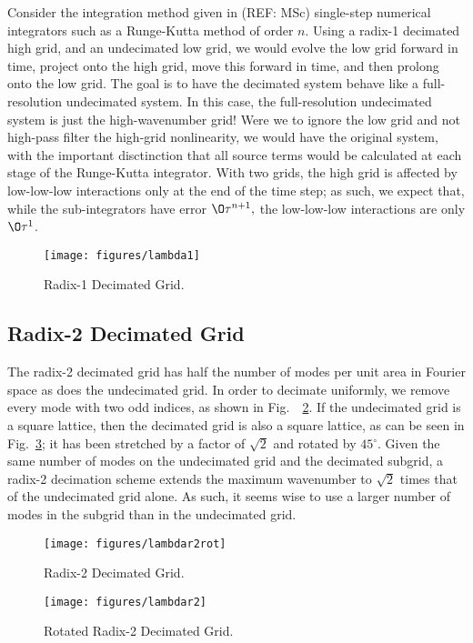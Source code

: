\documentclass[10pt,showpacs,showkeys,%
amsfonts,amsmath,onecolumn,
floatfix,aps,superscriptaddress]{revtex4}
\begin{document}
Consider the integration method given in (REF: MSc) single-step
numerical integrators such as a Runge-Kutta method of order $n$.
Using a radix-1 decimated high grid, and an undecimated low grid, we
would evolve the low grid forward in time, project onto the high grid,
move this forward in time, and then prolong onto the low grid.  The
goal is to have the decimated system behave like a full-resolution
undecimated system.  In this case, the full-resolution undecimated
system is just the high-wavenumber grid!  Were we to ignore the low
grid and not high-pass filter the high-grid nonlinearity, we would
have the original system, with the important disctinction that all
source terms would be calculated at each stage of the Runge-Kutta
integrator.  With two grids, the high grid is affected by low-low-low
interactions only at the end of the time step; as such, we expect that,
while the sub-integrators have error $\O\tau^{n+1},$ the low-low-low
interactions are only $\O\tau^1$.

\begin{figure}[htbp]
  \begin{center}
    \texttt{[image: figures/lambda1]}
    \caption{Radix-1 Decimated Grid.}
    \label{lambda1}
  \end{center}
\end{figure}


\subsection{Radix-2 Decimated Grid}
The radix-2 decimated grid has half the number of modes per unit area
in Fourier space as does the undecimated grid.  In order to decimate uniformly,
we remove every mode with two odd indices, as shown in Fig.\ ~\ref{lambdar2rot}.
If the undecimated grid is a square lattice, then the decimated grid is also
a square lattice, as can be seen in Fig.\ \ref{lambdar2}; it has been
stretched by a factor of $\sqrt{2}$ and rotated by $45\ensuremath{^\circ}$.
Given the same number of modes on the undecimated grid and the decimated
subgrid, a radix-2 decimation scheme extends the maximum wavenumber to 
$\sqrt{2}$ times that of the undecimated grid alone. As such, it seems wise
to use a larger number of modes in the subgrid than in the undecimated grid.


\begin{figure}[htbp]
  \begin{center}
    \texttt{[image: figures/lambdar2rot]}
    \caption{Radix-2 Decimated Grid.}
    \label{lambdar2rot}
  \end{center}
\end{figure}
\begin{figure}[htbp]
  \begin{center}
    \texttt{[image: figures/lambdar2]}
    \caption{Rotated Radix-2 Decimated Grid.}
    \label{lambdar2}
  \end{center}
\end{figure}
\end{document}
